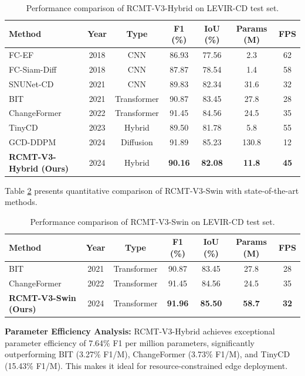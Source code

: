 \documentclass[journal]{IEEEtran}
\begin{document}
{\begin{table}[ht]
\centering
\caption{Performance comparison of RCMT-V3-Hybrid on LEVIR-CD test set.}
\label{tab:main_hybrid}
\begin{tabular}{lcccccc}
\toprule
\textbf{Method} & \textbf{Year} & \textbf{Type} & \textbf{F1 (\%)} & \textbf{IoU (\%)} & \textbf{Params (M)} & \textbf{FPS} \\
\midrule
    FC-EF & 2018 & CNN & 86.93 & 77.56 & 2.3 & 62 \\
    FC-Siam-Diff & 2018 & CNN & 87.87 & 78.54 & 1.4 & 58 \\
    SNUNet-CD & 2021 & CNN & 89.83 & 82.34 & 31.6 & 32 \\
    BIT & 2021 & Transformer & 90.87 & 83.45 & 27.8 & 28 \\
    ChangeFormer & 2022 & Transformer & 91.45 & 84.56 & 24.5 & 35 \\
    TinyCD & 2023 & Hybrid & 89.50 & 81.78 & 5.8 & 55 \\
    GCD-DDPM & 2024 & Diffusion & 91.89 & 85.23 & 130.8 & 12 \\
    \midrule
    \textbf{RCMT-V3-Hybrid (Ours)} & 2024 & Hybrid & \textbf{90.16} & \textbf{82.08} & \textbf{11.8} & \textbf{45} \\
\bottomrule
\end{tabular}
\end{table}

Table \ref{tab:main_swin} presents quantitative comparison of RCMT-V3-Swin with state-of-the-art methods.

\begin{table}[ht]
\centering
\caption{Performance comparison of RCMT-V3-Swin on LEVIR-CD test set.}
\label{tab:main_swin}
\begin{tabular}{lcccccc}
\toprule
\textbf{Method} & \textbf{Year} & \textbf{Type} & \textbf{F1 (\%)} & \textbf{IoU (\%)} & \textbf{Params (M)} & \textbf{FPS} \\
\midrule
    BIT & 2021 & Transformer & 90.87 & 83.45 & 27.8 & 28 \\
    ChangeFormer & 2022 & Transformer & 91.45 & 84.56 & 24.5 & 35 \\
    \midrule
    \textbf{RCMT-V3-Swin (Ours)} & 2024 & Transformer & \textbf{91.96} & \textbf{85.50} & \textbf{58.7} & \textbf{32} \\
\bottomrule
\end{tabular}
\end{table}

\textbf{Parameter Efficiency Analysis:} RCMT-V3-Hybrid achieves exceptional parameter efficiency of 7.64\% F1 per million parameters, significantly outperforming BIT (3.27\% F1/M), ChangeFormer (3.73\% F1/M), and TinyCD (15.43\% F1/M). This makes it ideal for resource-constrained edge deployment.

}
\end{document}
